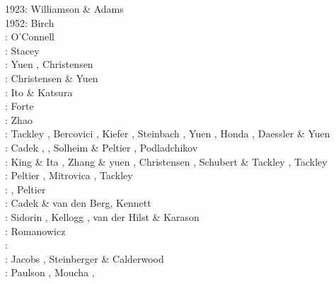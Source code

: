 \begin{scriptsize}
1923: Williamson \& Adams \cite{wiad23}\\
1952: Birch \cite{birc52}\\
\nineteenseventysix: O'Connell \cite{ocon76}\\
\nineteenseventyseven: Stacey \cite{stac77}\\
\nineteeneightytwo: Yuen \etal \cite{yusb82}, Christensen \cite{chri82}\\
\nineteeneightyfive: Christensen \& Yuen \cite{chyu85}\\
\nineteeneightynine: Ito \& Katsura \cite{itka89} \\
\nineteenninetyone: Forte \etal \cite{fopd91} \\
\nineteenninetytwo: Zhao \etal \cite{zhyh92}\\
\nineteenninetythree: Tackley \etal \cite{tasg93}, Bercovici \etal \cite{best93}, 
                      Kiefer \cite{kief93}, Steinbach \etal \cite{styz93},
                      Yuen \etal \cite{yucc93}, Honda \etal \cite{hoby93}, 
                      Daessler \& Yuen \cite{dayu93} \\
\nineteenninetyfour: Cadek \etal \cite{cays94}, \cite{vayv94}
                    \cite{zhgu94b}\cite{styu94}, Solheim \& Peltier \cite{sope94},
                    Podladchikov \etal \cite{popy94}\\
\nineteenninetyfive: King \& Ita \cite{kiit95}, Zhang \& yuen \cite{zhyu95}, 
                     Christensen \cite{chri95}, Schubert \& Tackley \cite{scta95},
                     Tackley \cite{tack95}\\
\nineteenninetysix: Peltier \cite{pelt96}, Mitrovica \cite{mitr96}, Tackley \cite{tack96b}\\
\nineteenninetyseven: \cite{mifo97}, Peltier \etal \cite{pebs97}\\
\nineteenninetyeight: Cadek \& van den Berg\cite{cava98}, Kennett \cite{kenn98}\\
\nineteenninetynine: Sidorin \etal \cite{sigh99}, Kellogg \etal \cite{kehv99}, 
                     van der Hilst \& Karason \cite{vaka99}\\
\nineteenninetyone: Romanowicz \cite{roma01}\\
\twothousandfive: \cite{hett05}\cite{nata05b}\cite{nabu05}\cite{stli05}\cite{stli05b}\\
\twothousandsix: Jacobs \etal \cite{javd06}, Steinberger \& Calderwood \cite{stca06}\\
\twothousandseven: Paulson \etal \cite{pazw07}, Moucha \etal \cite{mofm07}, 

\end{scriptsize}
